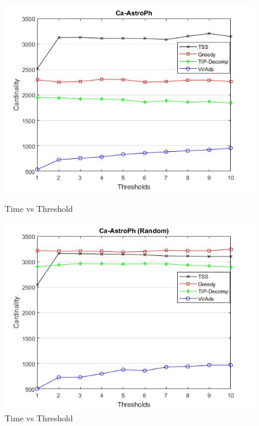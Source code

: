 \begin{figure}[h!]
\begin{minipage}[t]{0.50\textwidth}
\includegraphics[width=\linewidth,keepaspectratio=true]{images/ca-astrophtime.jpg}
\caption{Time vs Threshold}

\end{minipage}
\begin{minipage}[t]{0.50\textwidth}
\includegraphics[width=\linewidth,keepaspectratio=true]{images/ca-astrophtimerandom.jpg}
\caption{Time vs Threshold}
\end{minipage}
\end{figure}

